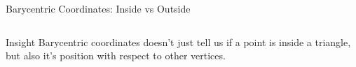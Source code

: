 \begin{frame}{Barycentric Coordinates: Inside vs Outside}
\begin{columns}
\begin{column}{0.5\textwidth}
        \end{column}
    \end{columns}
    \pause
    \begin{conceptbox}{Insight}
        Barycentric coordinates doesn't just tell us if a point is inside a triangle, but also it's position with respect to other vertices.
    \end{conceptbox}
\end{frame}

